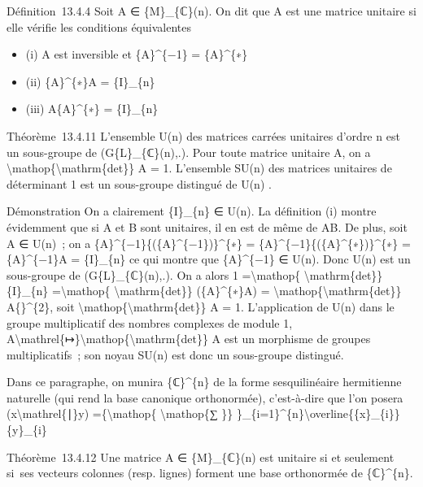 \documentclass[]{article}
\begin{document}
Définition~13.4.4 Soit A ∈ \{M\}\_\{ℂ\}(n). On dit que A est une matrice
unitaire si elle vérifie les conditions équivalentes

\begin{itemize}
\itemsep1pt\parskip0pt
\item
  (i) A est inversible et \{A\}\^{}\{−1\} = \{A\}\^{}\{∗\}
\item
  (ii) \{A\}\^{}\{∗\}A = \{I\}\_\{n\}
\item
  (iii) A\{A\}\^{}\{∗\} = \{I\}\_\{n\}
\end{itemize}

Théorème~13.4.11 L'ensemble U(n) des matrices carrées unitaires d'ordre
n est un sous-groupe de (G\{L\}\_\{ℂ\}(n),.). Pour toute matrice
unitaire A, on a
\textbar{}\textbackslash{}mathop\{\textbackslash{}mathrm\{det\}\}
A\textbar{} = 1. L'ensemble SU(n) des matrices unitaires de déterminant
1 est un sous-groupe distingué de U(n) .

Démonstration On a clairement \{I\}\_\{n\} ∈ U(n). La définition (i)
montre évidemment que si A et B sont unitaires, il en est de même de AB.
De plus, soit A ∈ U(n)~; on a
\{A\}\^{}\{−1\}\{(\{A\}\^{}\{−1\})\}\^{}\{∗\} =
\{A\}\^{}\{−1\}\{(\{A\}\^{}\{∗\})\}\^{}\{∗\} = \{A\}\^{}\{−1\}A =
\{I\}\_\{n\} ce qui montre que \{A\}\^{}\{−1\} ∈ U(n). Donc U(n) est un
sous-groupe de (G\{L\}\_\{ℂ\}(n),.). On a alors 1
=\textbackslash{}mathop\{ \textbackslash{}mathrm\{det\}\} \{I\}\_\{n\}
=\textbackslash{}mathop\{ \textbackslash{}mathrm\{det\}\}
(\{A\}\^{}\{∗\}A) =
\textbar{}\textbackslash{}mathop\{\textbackslash{}mathrm\{det\}\}
A\{\textbar{}\}\^{}\{2\}, soit
\textbar{}\textbackslash{}mathop\{\textbackslash{}mathrm\{det\}\}
A\textbar{} = 1. L'application de U(n) dans le groupe multiplicatif des
nombres complexes de module 1,
A\textbackslash{}mathrel\{↦\}\textbackslash{}mathop\{\textbackslash{}mathrm\{det\}\}
A est un morphisme de groupes multiplicatifs~; son noyau SU(n) est donc
un sous-groupe distingué.

Dans ce paragraphe, on munira \{ℂ\}\^{}\{n\} de la forme sesquilinéaire
hermitienne naturelle (qui rend la base canonique orthonormée),
c'est-à-dire que l'on posera (x\textbackslash{}mathrel\{∣\}y)
=\{\textbackslash{}mathop\{ \textbackslash{}mathop\{∑ \}\}
\}\_\{i=1\}\^{}\{n\}\textbackslash{}overline\{\{x\}\_\{i\}\}\{y\}\_\{i\}

Théorème~13.4.12 Une matrice A ∈ \{M\}\_\{ℂ\}(n) est unitaire si et
seulement si~ses vecteurs colonnes (resp. lignes) forment une base
orthonormée de \{ℂ\}\^{}\{n\}.
\end{document}
